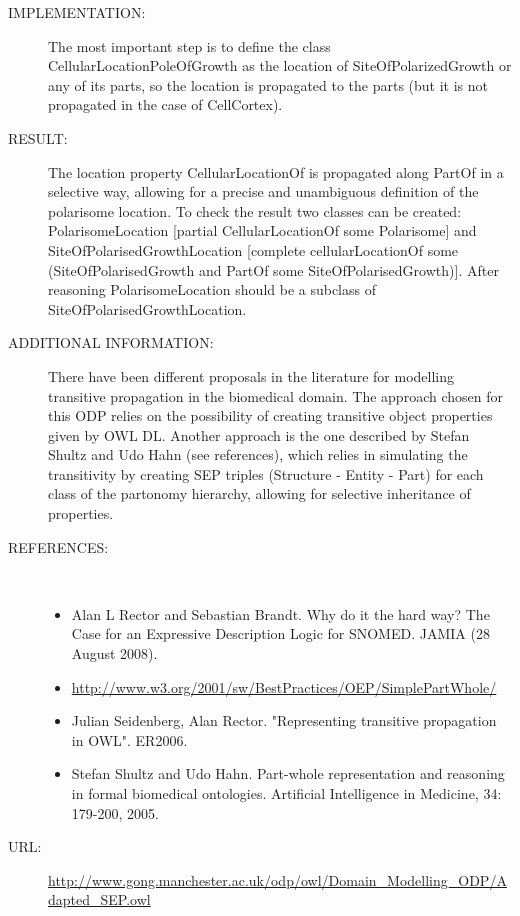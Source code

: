 \begin{description}
\item [IMPLEMENTATION:] The most important step is to define the class CellularLocationPoleOfGrowth as the location of SiteOfPolarizedGrowth or any of its parts, so the location is propagated to the parts (but it is not propagated in the case of CellCortex).

\item [RESULT:] The location property CellularLocationOf is propagated along PartOf in a selective way, allowing for a precise and unambiguous definition of the polarisome location. To check the result two classes can be created: PolarisomeLocation [partial CellularLocationOf some Polarisome] and SiteOfPolarisedGrowthLocation [complete cellularLocationOf some (SiteOfPolarisedGrowth and PartOf some SiteOfPolarisedGrowth)]. After reasoning PolarisomeLocation should be a subclass of SiteOfPolarisedGrowthLocation.

\item [ADDITIONAL INFORMATION:] There have been different proposals in the literature for modelling transitive propagation in the biomedical domain. The approach chosen for this ODP relies on the possibility of creating transitive object properties given by OWL DL. Another approach is the one described by Stefan Shultz and Udo Hahn (see references), which relies in simulating the transitivity by creating SEP triples (Structure - Entity - Part) for each class of the partonomy hierarchy, allowing for selective inheritance of properties.

\item [REFERENCES: ] ~\begin{itemize}
\item Alan L Rector and Sebastian Brandt. Why do it the hard way? The Case for an Expressive Description Logic for SNOMED.  JAMIA (28 August 2008).
\item \url{http://www.w3.org/2001/sw/BestPractices/OEP/SimplePartWhole/}
\item Julian Seidenberg, Alan Rector. "Representing transitive propagation in OWL". ER2006.
\item Stefan Shultz and Udo Hahn. Part-whole representation and reasoning in formal biomedical ontologies. Artificial Intelligence in Medicine, 34: 179-200, 2005.\end{itemize}
\item [URL: ] \url{http://www.gong.manchester.ac.uk/odp/owl/Domain_Modelling_ODP/Adapted_SEP.owl} \end{description}